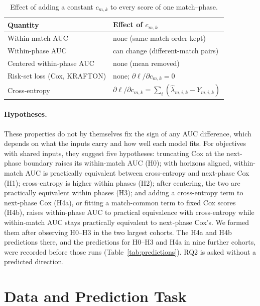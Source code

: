 \documentclass[sigconf,anonymous,nonacm]{acmart}
\begin{document}
\begin{table}[t]
\centering\footnotesize
\caption{Effect of adding a constant $c_{m,k}$ to every score of one match--phase.}
\label{tab:account}
\setlength{\tabcolsep}{3pt}
\begin{tabular}{ll}
\toprule
Quantity & Effect of $c_{m,k}$ \\
\midrule
Within-match AUC & none (same-match order kept) \\
Within-phase AUC & can change (different-match pairs) \\
Centered within-phase AUC & none (mean removed) \\
Risk-set loss (Cox, KRAFTON) & none; $\partial\ell/\partial c_{m,k}=0$ \\
Cross-entropy & $\partial\ell/\partial c_{m,k}=\sum_{i}(\hat\lambda_{m,i,k}-Y_{m,i,k})$ \\
\bottomrule
\end{tabular}
\end{table}

\paragraph{Hypotheses.}
These properties do not by themselves fix the sign of any AUC difference, which depends on what the inputs carry and how well each model fits. For objectives with shared inputs, they suggest five hypotheses: truncating Cox at the next-phase boundary raises its within-match AUC (H0); with horizons aligned, within-match AUC is practically equivalent between cross-entropy and next-phase Cox (H1); cross-entropy is higher within phases (H2); after centering, the two are practically equivalent within phases (H3); and adding a cross-entropy term to next-phase Cox (H4a), or fitting a match-common term to fixed Cox scores (H4b), raises within-phase AUC to practical equivalence with cross-entropy while within-match AUC stays practically equivalent to next-phase Cox's. We formed them after observing H0--H3 in the two largest cohorts. The H4a and H4b predictions there, and the predictions for H0--H3 and H4a in nine further cohorts, were recorded before those runs (Table~\ref{tab:predictions}). RQ2 is asked without a predicted direction.

\section{Data and Prediction Task}
\label{sec:method}
\end{document}
